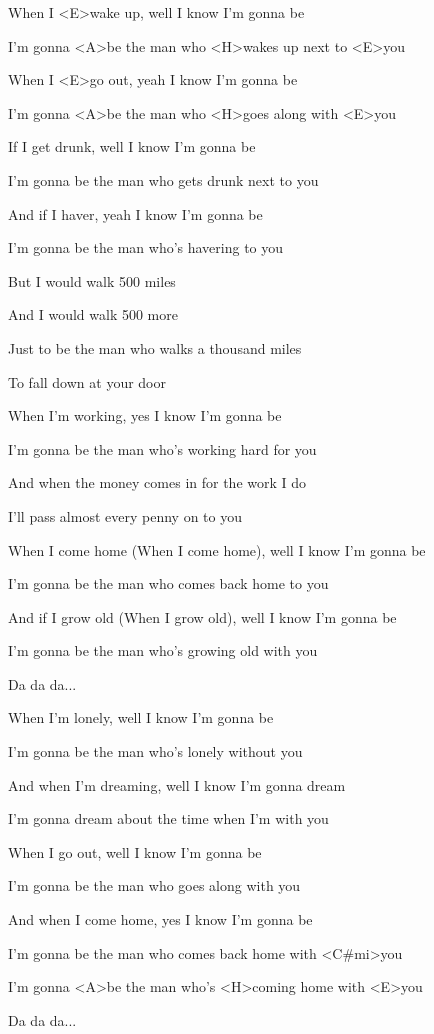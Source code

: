 

\zs
When I <E>wake up, well I know I'm gonna be

I'm gonna <A>be the man who <H>wakes up next to <E>you

When I <E>go out, yeah I know I'm gonna be

I'm gonna <A>be the man who <H>goes along with <E>you
\ks

\zs
If I get drunk, well I know I'm gonna be

I'm gonna be the man who gets drunk next to you

And if I haver, yeah I know I'm gonna be

I'm gonna be the man who's havering to you
\ks

\zr
But I would walk 500 miles

And I would walk 500 more

Just to be the man who walks a thousand miles

To fall down at your door
\kr

\zs
When I'm working, yes I know I'm gonna be

I'm gonna be the man who's working hard for you

And when the money comes in for the work I do

I'll pass almost every penny on to you
\ks

\zs
When I come home (When I come home), well I know I'm gonna be

I'm gonna be the man who comes back home to you

And if I grow old (When I grow old), well I know I'm gonna be

I'm gonna be the man who's growing old with you
\ks

\zr \kr

Da da da...

\zs
When I'm lonely, well I know I'm gonna be

I'm gonna be the man who's lonely without you

And when I'm dreaming, well I know I'm gonna dream

I'm gonna dream about the time when I'm with you
\ks

\zs
When I go out, well I know I'm gonna be

I'm gonna be the man who goes along with you

And when I come home, yes I know I'm gonna be

I'm gonna be the man who comes back home with <C#mi>you

I'm gonna <A>be the man who's <H>coming home with <E>you
\ks

\zr \kr

Da da da...

\zr \kr
\kp
